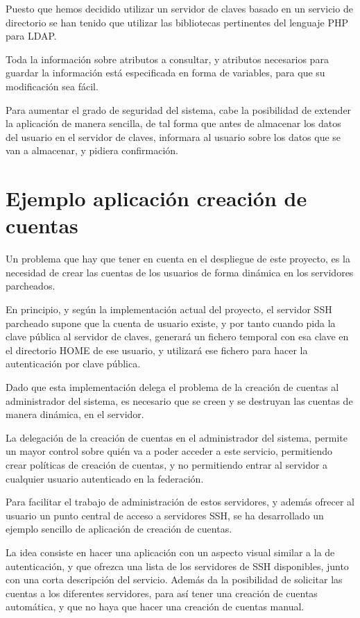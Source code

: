     Puesto que hemos decidido utilizar un servidor de claves basado en un
    servicio de directorio se han tenido que utilizar las bibliotecas
    pertinentes del lenguaje PHP para LDAP.

    Toda la información sobre atributos a consultar, y atributos necesarios
    para guardar la información está especificada en forma de variables,
    para que su modificación sea fácil.

    Para aumentar el grado de seguridad del sistema, cabe la posibilidad de
    extender la aplicación de manera sencilla, de tal forma que antes de
    almacenar los datos del usuario en el servidor de claves, informara al
    usuario sobre los datos que se van a almacenar, y pidiera confirmación.

    \section{Ejemplo aplicación creación de cuentas}

    Un problema que hay que tener en cuenta en el despliegue de este
    proyecto, es la necesidad de crear las cuentas de los usuarios de forma
    dinámica en los servidores parcheados.

    En principio, y según la implementación actual del proyecto, el
    servidor SSH parcheado supone que la cuenta de usuario existe, y por
    tanto cuando pida la clave pública al servidor de claves, generará un
    fichero temporal con esa clave en el directorio HOME de ese usuario, y
    utilizará ese fichero para hacer la autenticación por clave pública.

    Dado que esta implementación delega el problema de la creación de
    cuentas al administrador del sistema, es necesario que se creen y se
    destruyan las cuentas de manera dinámica, en el servidor.

    La delegación de la creación de cuentas en el administrador del
    sistema, permite un mayor control sobre quién va a poder acceder a este
    servicio, permitiendo crear políticas de creación de cuentas, y no
    permitiendo entrar al servidor a cualquier usuario autenticado en la
    federación.

    Para facilitar el trabajo de administración de estos servidores, y
    además ofrecer al usuario un punto central de acceso a servidores SSH,
    se ha desarrollado un ejemplo sencillo de aplicación de creación de
    cuentas.

    La idea consiste en hacer una aplicación con un aspecto visual similar
    a la de autenticación, y que ofrezca una lista de los servidores de SSH
    disponibles, junto con una corta descripción del servicio. Además da la
    posibilidad de solicitar las cuentas a los diferentes servidores, para
    así tener una creación de cuentas automática, y que no haya que hacer
    una creación de cuentas manual.

